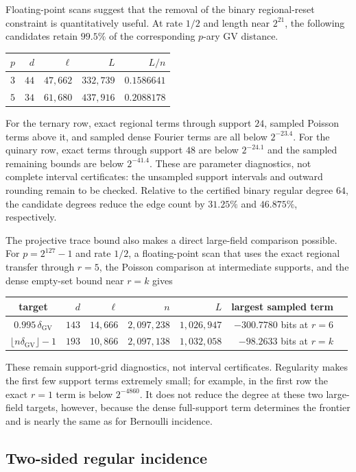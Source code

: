 Floating-point scans suggest that the removal of the binary regional-reset
constraint is quantitatively useful.  At rate $1/2$ and length near $2^{21}$,
the following candidates retain $99.5\%$ of the corresponding $p$-ary GV
distance.
\begin{center}
\begin{tabular}{c|rrrr}
 $p$&$d$&$\ell$&$L$&$L/n$\\\hline
 $3$&$44$&$47{,}662$&$332{,}739$&$0.1586641$\\
 $5$&$34$&$61{,}680$&$437{,}916$&$0.2088178$
\end{tabular}
\end{center}
For the ternary row, exact regional terms through support $24$, sampled
Poisson terms above it, and sampled dense Fourier terms are all below
$2^{-23.4}$.  For the quinary row, exact terms through support $48$ are below
$2^{-24.1}$ and the sampled remaining bounds are below $2^{-41.4}$.  These
are parameter diagnostics, not complete interval certificates: the unsampled
support intervals and outward rounding remain to be checked.  Relative to the
certified binary regular degree $64$, the candidate degrees reduce the edge
count by $31.25\%$ and $46.875\%$, respectively.

The projective trace bound also makes a direct large-field comparison
possible.  For $p=2^{127}-1$ and rate $1/2$, a floating-point scan that uses
the exact regional transfer through $r=5$, the Poisson comparison at
intermediate supports, and the dense empty-set bound near $r=k$ gives
\begin{center}
\begin{tabular}{c|rrrrrl}
 target&$d$&$\ell$&$n$&$L$&largest sampled term\\\hline
 $0.995\,\delta_{\mathrm{GV}}$&$143$&$14{,}666$&$2{,}097{,}238$
   &$1{,}026{,}947$&$-300.7780$ bits at $r=6$\\
 $\lfloor n\delta_{\mathrm{GV}}\rfloor-1$&$193$&$10{,}866$
   &$2{,}097{,}138$&$1{,}032{,}058$&$-98.2633$ bits at $r=k$
\end{tabular}
\end{center}
These remain support-grid diagnostics, not interval certificates.  Regularity
makes the first few support terms extremely small; for example, in the first
row the exact $r=1$ term is below $2^{-4860}$.  It does not reduce the degree
at these two large-field targets, however, because the dense full-support
term determines the frontier and is nearly the same as for Bernoulli
incidence.

\subsection{Two-sided regular incidence}

